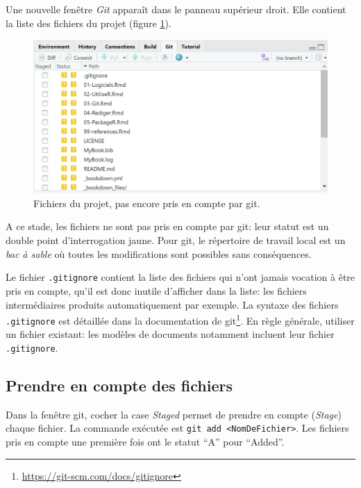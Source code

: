 \documentclass[
  11pt,
  french,
  a4paper,
  extrafontsizes,onecolumn,openright
  ]{memoir}
\begin{document}
\normalsize

Une nouvelle fenêtre \emph{Git} apparaît dans le panneau supérieur droit.
Elle contient la liste des fichiers du projet (figure \ref{fig:git-Fichiers}).



\scriptsize

\begin{figure}

{\centering \includegraphics[width=0.8\linewidth]{images/git-Fichiers} 

}

\caption{Fichiers du projet, pas encore pris en compte par git.}\label{fig:git-Fichiers}
\end{figure}

\normalsize

A ce stade, les fichiers ne sont pas pris en compte par git: leur statut est un double point d'interrogation jaune.
Pour git, le répertoire de travail local est un \emph{bac à sable} où toutes les modifications sont possibles sans conséquences.

Le fichier \texttt{.gitignore} contient la liste des fichiers qui n'ont jamais vocation à être pris en compte, qu'il est donc inutile d'afficher dans la liste: les fichiers intermédiaires produits automatiquement par exemple.
La syntaxe des fichiers \texttt{.gitignore} est détaillée dans la documentation de git\footnote{\url{https://git-scm.com/docs/gitignore}}.
En règle générale, utiliser un fichier existant: les modèles de documents notamment incluent leur fichier \texttt{.gitignore}.

\hypertarget{prendre-en-compte-des-fichiers}{%
\subsection{Prendre en compte des fichiers}\label{prendre-en-compte-des-fichiers}}

Dans la fenêtre git, cocher la case \emph{Staged} permet de prendre en compte (\emph{Stage}) chaque fichier.
La commande exécutée est \texttt{git\ add\ \textless{}NomDeFichier\textgreater{}}.
Les fichiers pris en compte une première fois ont le statut ``A'' pour ``Added''.
\end{document}
